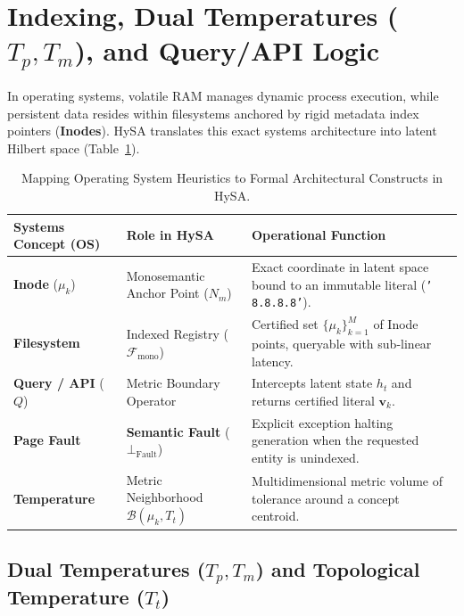 \documentclass[11pt,a4paper]{article}
\theoremstyle{definition}
\begin{document}
\section{Indexing, Dual Temperatures \texorpdfstring{($T_p, T_m$)}{(Tp, Tm)}, and Query/API Logic}

In operating systems, volatile RAM manages dynamic process execution, while persistent data resides within filesystems anchored by rigid metadata index pointers (\textbf{Inodes}). HySA translates this exact systems architecture into latent Hilbert space (Table~\ref{tab:systems_mapping}).

\begin{table}[t]
\centering
\caption{Mapping Operating System Heuristics to Formal Architectural Constructs in HySA.}
\label{tab:systems_mapping}
\vspace{0.15cm}
\small
\setlength{\tabcolsep}{4.0pt}
\begin{tabular}{@{}p{3.2cm}p{3.8cm}p{8.5cm}@{}}
\toprule
\textbf{Systems Concept (OS)} & \textbf{Role in HySA} & \textbf{Operational Function} \\ \midrule
\textbf{Inode} ($\mu_k$) & Monosemantic Anchor Point ($N_m$) & Exact coordinate in latent space bound to an immutable literal (\texttt{' 8.8.8.8'}). \\[4pt]
\textbf{Filesystem} & Indexed Registry ($\mathcal{F}_{\mathrm{mono}}$) & Certified set $\{\mu_k\}_{k=1}^M$ of Inode points, queryable with sub-linear latency. \\[4pt]
\textbf{Query / API} ($Q$) & Metric Boundary Operator & Intercepts latent state $h_t$ and returns certified literal $\mathbf{v}_k$. \\[4pt]
\textbf{Page Fault} & \textbf{Semantic Fault} ($\bot_{\mathrm{Fault}}$) & Explicit exception halting generation when the requested entity is unindexed. \\[4pt]
\textbf{Temperature} & Metric Neighborhood $\mathcal{B}(\mu_k, T_t)$ & Multidimensional metric volume of tolerance around a concept centroid. \\ \bottomrule
\end{tabular}
\end{table}

\subsection{Dual Temperatures \texorpdfstring{($T_p, T_m$)}{(Tp, Tm)} and Topological Temperature \texorpdfstring{($T_t$)}{(Tt)}}
\end{document}
